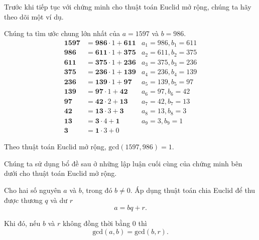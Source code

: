 Trước khi tiếp tục với chứng minh cho thuật toán Euclid mở rộng, chúng ta hãy theo dõi một ví dụ.
\begin{example}
	Chúng ta tìm ước chung lớn nhất của $a = 1597$ và $b = 986$.
	\begin{align*}
		\mathbf{1597} & = \mathbf{986}\cdot 1 + \mathbf{611} & a_{1} = 986, b_{1} = 611 \\
		\mathbf{986}  & = \mathbf{611}\cdot 1 + \mathbf{375} & a_{2} = 611, b_{2} = 375 \\
		\mathbf{611}  & = \mathbf{375}\cdot 1 + \mathbf{236} & a_{3} = 375, b_{3} = 236 \\
		\mathbf{375}  & = \mathbf{236}\cdot 1 + \mathbf{139} & a_{4} = 236, b_{4} = 139 \\
		\mathbf{236}  & = \mathbf{139}\cdot 1 + \mathbf{97}  & a_{5} = 139, b_{5} = 97  \\
		\mathbf{139}  & = \mathbf{97}\cdot 1 + \mathbf{42}   & a_{6} = 97, b_{6} = 42   \\
		\mathbf{97}   & = \mathbf{42}\cdot 2 + \mathbf{13}   & a_{7} = 42, b_{7} = 13   \\
		\mathbf{42}   & = \mathbf{13}\cdot 3 + \mathbf{3}    & a_{8} = 13, b_{8} = 3    \\
		\mathbf{13}   & = \mathbf{3}\cdot 4 + \mathbf{1}     & a_{9} = 3, b_{9} = 1     \\
		\mathbf{3}    & = \mathbf{1}\cdot 3 + 0
	\end{align*}

	Theo thuật toán Euclid mở rộng, $\text{gcd}(1597, 986) = 1$.
\end{example}

Chúng ta sử dụng bổ đề sau ở những lập luận cuối cùng của chứng minh bên dưới cho thuật toán Euclid mở rộng.

\begin{lemma}
	Cho hai số nguyên $a$ và $b$, trong đó $b\ne 0$. Áp dụng thuật toán chia Euclid để thu được thương $q$ và dư $r$
	\[
		a = b q + r.
	\]

	\noindent Khi đó, nếu $b$ và $r$ không đồng thời bằng $0$ thì
	\[
		\text{gcd}(a, b) = \text{gcd}(b, r).
	\]
\end{lemma}

